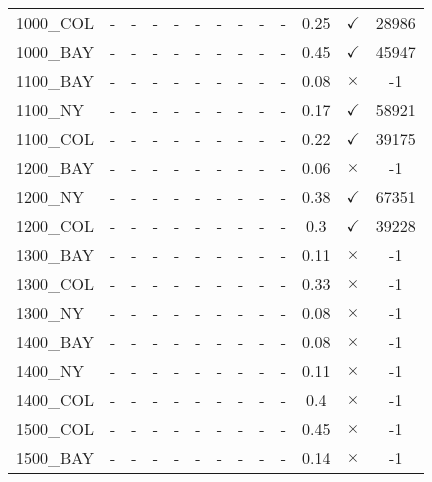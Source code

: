 \documentclass[main.tex]{subfiles}
\begin{document}
\begin{landscape}
\begin{center}
\begin{tabular}{lcccccccccccc}
1000\_COL & - & - & - 
 & - & - & - 
 & - & - & - 
 & 0.25 & $\checkmark$ & 28986\\
1000\_BAY & - & - & - 
 & - & - & - 
 & - & - & - 
 & 0.45 & $\checkmark$ & 45947\\
1100\_BAY & - & - & - 
 & - & - & - 
 & - & - & - 
 & 0.08 & $\times$ & -1\\
1100\_NY & - & - & - 
 & - & - & - 
 & - & - & - 
 & 0.17 & $\checkmark$ & 58921\\
1100\_COL & - & - & - 
 & - & - & - 
 & - & - & - 
 & 0.22 & $\checkmark$ & 39175\\
1200\_BAY & - & - & - 
 & - & - & - 
 & - & - & - 
 & 0.06 & $\times$ & -1\\
1200\_NY & - & - & - 
 & - & - & - 
 & - & - & - 
 & 0.38 & $\checkmark$ & 67351\\
1200\_COL & - & - & - 
 & - & - & - 
 & - & - & - 
 & 0.3 & $\checkmark$ & 39228\\
1300\_BAY & - & - & - 
 & - & - & - 
 & - & - & - 
 & 0.11 & $\times$ & -1\\
1300\_COL & - & - & - 
 & - & - & - 
 & - & - & - 
 & 0.33 & $\times$ & -1\\
1300\_NY & - & - & - 
 & - & - & - 
 & - & - & - 
 & 0.08 & $\times$ & -1\\
1400\_BAY & - & - & - 
 & - & - & - 
 & - & - & - 
 & 0.08 & $\times$ & -1\\
1400\_NY & - & - & - 
 & - & - & - 
 & - & - & - 
 & 0.11 & $\times$ & -1\\
1400\_COL & - & - & - 
 & - & - & - 
 & - & - & - 
 & 0.4 & $\times$ & -1\\
1500\_COL & - & - & - 
 & - & - & - 
 & - & - & - 
 & 0.45 & $\times$ & -1\\
1500\_BAY & - & - & - 
 & - & - & - 
 & - & - & - 
 & 0.14 & $\times$ & -1\\
\hline\end{tabular}
\end{center}
\end{landscape}
\newpage
\end{document}

